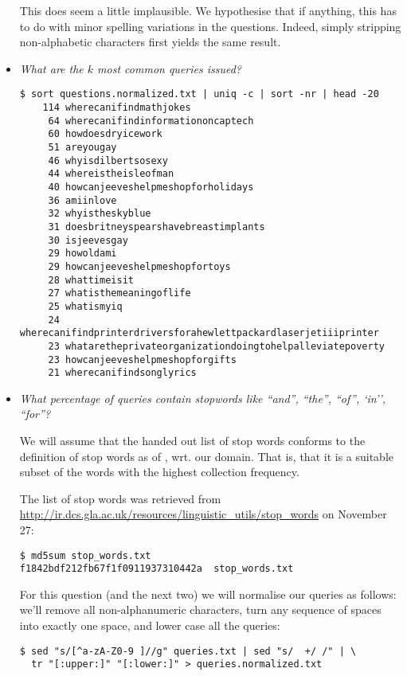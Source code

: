 \begin{itemize}
This does seem a little implausible. We hypothesise that if anything, this has
to do with minor spelling variations in the questions. Indeed, simply stripping
non-alphabetic characters first yields the same result.

\item \emph{What are the $k$ most common queries issued?}

\begin{lstlisting}
$ sort questions.normalized.txt | uniq -c | sort -nr | head -20
    114 wherecanifindmathjokes
     64 wherecanifindinformationoncaptech
     60 howdoesdryicework
     51 areyougay
     46 whyisdilbertsosexy
     44 whereistheisleofman
     40 howcanjeeveshelpmeshopforholidays
     36 amiinlove
     32 whyistheskyblue
     31 doesbritneyspearshavebreastimplants
     30 isjeevesgay
     29 howoldami
     29 howcanjeeveshelpmeshopfortoys
     28 whattimeisit
     27 whatisthemeaningoflife
     25 whatismyiq
     24 wherecanifindprinterdriversforahewlettpackardlaserjetiiiprinter
     23 whataretheprivateorganizationdoingtohelpalleviatepoverty
     23 howcanjeeveshelpmeshopforgifts
     21 wherecanifindsonglyrics
\end{lstlisting}

\item \emph{What percentage of queries contain stopwords like ``and'', ``the'',
``of'', `in'', ``for''?}

We will assume that the handed out list of stop words conforms to the
definition of stop words as of \cite[\textsection\ 2.2.2 (p. 27)]{irbook}, wrt.
our domain. That is, that it is a suitable subset of the words with the highest
collection frequency.

The list of stop words was retrieved from
\url{http://ir.dcs.gla.ac.uk/resources/linguistic_utils/stop_words} on November
27:

\begin{lstlisting}
$ md5sum stop_words.txt
f1842bdf212fb67f1f0911937310442a  stop_words.txt
\end{lstlisting}

For this question (and the next two) we will normalise our queries as follows:
we'll remove all non-alphanumeric characters, turn any sequence of spaces into
exactly one space, and lower case all the queries:

\begin{lstlisting}
$ sed "s/[^a-zA-Z0-9 ]//g" queries.txt | sed "s/  +/ /" | \
  tr "[:upper:]" "[:lower:]" > queries.normalized.txt
\end{lstlisting}


\end{itemize}
